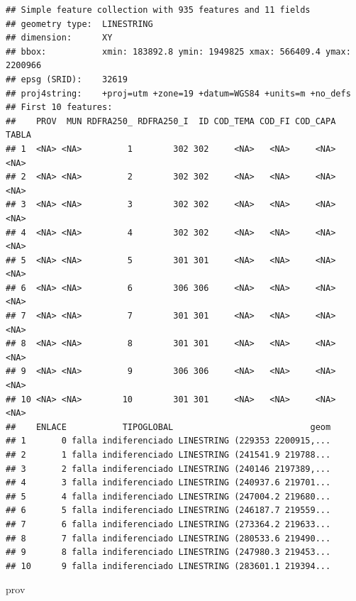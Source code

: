 \documentclass[11pt,]{article}
\newenvironment{Shaded}{\begin{snugshade}}{\end{snugshade}}
\newcommand{\NormalTok}[1]{#1}
\begin{document}
\begin{verbatim}
## Simple feature collection with 935 features and 11 fields
## geometry type:  LINESTRING
## dimension:      XY
## bbox:           xmin: 183892.8 ymin: 1949825 xmax: 566409.4 ymax: 2200966
## epsg (SRID):    32619
## proj4string:    +proj=utm +zone=19 +datum=WGS84 +units=m +no_defs
## First 10 features:
##    PROV  MUN RDFRA250_ RDFRA250_I  ID COD_TEMA COD_FI COD_CAPA TABLA
## 1  <NA> <NA>         1        302 302     <NA>   <NA>     <NA>  <NA>
## 2  <NA> <NA>         2        302 302     <NA>   <NA>     <NA>  <NA>
## 3  <NA> <NA>         3        302 302     <NA>   <NA>     <NA>  <NA>
## 4  <NA> <NA>         4        302 302     <NA>   <NA>     <NA>  <NA>
## 5  <NA> <NA>         5        301 301     <NA>   <NA>     <NA>  <NA>
## 6  <NA> <NA>         6        306 306     <NA>   <NA>     <NA>  <NA>
## 7  <NA> <NA>         7        301 301     <NA>   <NA>     <NA>  <NA>
## 8  <NA> <NA>         8        301 301     <NA>   <NA>     <NA>  <NA>
## 9  <NA> <NA>         9        306 306     <NA>   <NA>     <NA>  <NA>
## 10 <NA> <NA>        10        301 301     <NA>   <NA>     <NA>  <NA>
##    ENLACE           TIPOGLOBAL                           geom
## 1       0 falla indiferenciado LINESTRING (229353 2200915,...
## 2       1 falla indiferenciado LINESTRING (241541.9 219788...
## 3       2 falla indiferenciado LINESTRING (240146 2197389,...
## 4       3 falla indiferenciado LINESTRING (240937.6 219701...
## 5       4 falla indiferenciado LINESTRING (247004.2 219680...
## 6       5 falla indiferenciado LINESTRING (246187.7 219559...
## 7       6 falla indiferenciado LINESTRING (273364.2 219633...
## 8       7 falla indiferenciado LINESTRING (280533.6 219490...
## 9       8 falla indiferenciado LINESTRING (247980.3 219453...
## 10      9 falla indiferenciado LINESTRING (283601.1 219394...
\end{verbatim}

\begin{Shaded}
\begin{Highlighting}[]
\NormalTok{prov}
\end{Highlighting}
\end{Shaded}
\end{document}
